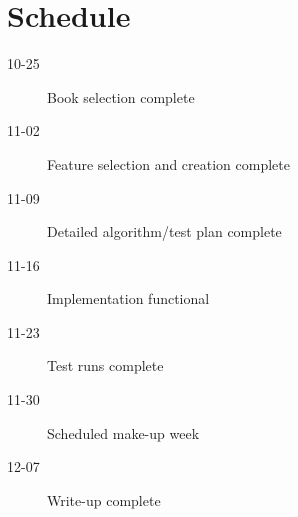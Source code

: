 \documentclass[11pt,letterpaper]{article}
\begin{document}
\section*{Schedule}
\begin{description}
	\item[10-25] Book selection complete
	\item[11-02] Feature selection and creation complete
	\item[11-09] Detailed algorithm/test plan complete
	\item[11-16] Implementation functional
	\item[11-23] Test runs complete
	\item[11-30] Scheduled make-up week
	\item[12-07] Write-up complete
\end{description}

  
\nocite{*}

\end{document}
